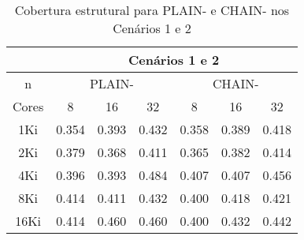 \begin{table}[ht]
    \tiny
    \centering
    \caption{Cobertura estrutural para PLAIN- e CHAIN- nos Cenários 1 e 2}\label{coverage-minus}
    \begin{tabular}{c|ccc|ccc}
        \toprule
               & \multicolumn{6}{c}{Cenários 1 e 2}                       \\\midrule
        n      & \multicolumn{3}{c}{PLAIN-} & \multicolumn{3}{c}{CHAIN-}  \\\midrule
        Cores  &  8      &  16     &  32    &  8      &  16     &  32     \\\midrule
        1Ki    &  0.354  &  0.393  &  0.432 &  0.358  &  0.389  &  0.418  \\\midrule
        2Ki    &  0.379  &  0.368  &  0.411 &  0.365  &  0.382  &  0.414  \\\midrule
        4Ki    &  0.396  &  0.393  &  0.484 &  0.407  &  0.407  &  0.456  \\\midrule
        8Ki    &  0.414  &  0.411  &  0.432 &  0.400  &  0.418  &  0.421  \\\midrule
        16Ki   &  0.414  &  0.460  &  0.460 &  0.400  &  0.432  &  0.442  \\
        \bottomrule
    \end{tabular}
\end{table}

